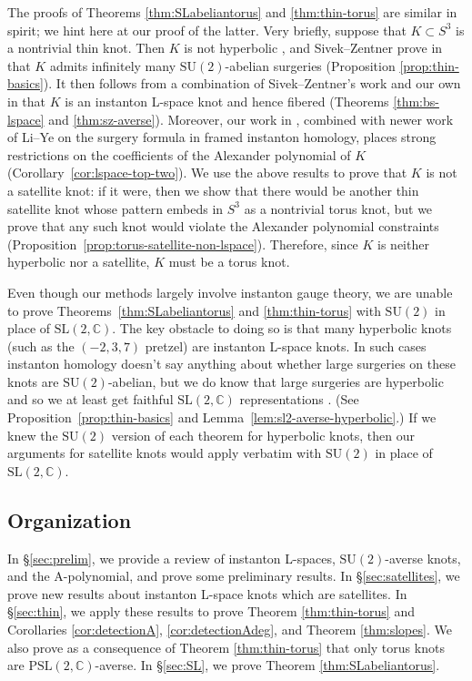 \documentclass[11pt]{amsart}
\numberwithin{equation}{section}
\numberwithin{theorem}{section}
\theoremstyle{definition}
\newcommand{\C}{\mathbb{C}}
\newcommand\SU{\mathrm{SU}}
\newcommand\SL{\mathrm{SL}}
\newcommand\PSL{\mathrm{PSL}}
\begin{document}
The proofs of Theorems \ref{thm:SLabeliantorus} and \ref{thm:thin-torus} are similar in spirit; we hint here at our proof of the latter. Very briefly, suppose that $K\subset S^3$ is a nontrivial thin knot. Then $K$ is not hyperbolic \cite{ccgls}, and Sivek--Zentner prove in \cite{sz-pillowcase} that $K$ admits infinitely many $\SU(2)$-abelian surgeries (Proposition \ref{prop:thin-basics}). It then follows from a combination of Sivek--Zentner's work and our own in \cite{bs-stein,bs-lspace} that $K$ is an instanton L-space knot and hence fibered (Theorems \ref{thm:bs-lspace} and \ref{thm:sz-averse}). Moreover, our work in \cite{bs-trefoil}, combined with newer work of Li--Ye \cite{li-ye-surgery} on the surgery formula in framed instanton homology, places strong restrictions on the coefficients of the Alexander polynomial of $K$ (Corollary~\ref{cor:lspace-top-two}). We use the above results to prove that $K$ is not a satellite knot: if it were, then we show that there would be another thin satellite knot whose pattern embeds in $S^3$ as a nontrivial torus knot, but we prove that any such knot would violate the Alexander polynomial constraints (Proposition~\ref{prop:torus-satellite-non-lspace}). Therefore, since $K$ is neither hyperbolic nor a satellite, $K$ must be a torus knot.

Even though our methods largely involve instanton gauge theory, we are unable to prove Theorems~\ref{thm:SLabeliantorus} and \ref{thm:thin-torus} with $\SU(2)$ in place of $\SL(2,\C)$.  The key obstacle to doing so is that many hyperbolic knots (such as the $(-2,3,7)$ pretzel) are instanton L-space knots.  In such cases instanton homology doesn't say anything about whether large surgeries on these knots are $\SU(2)$-abelian, but we do know that large surgeries are hyperbolic \cite{thurston-notes} and so we at least get faithful $\SL(2,\C)$ representations \cite{cs-splittings}.  (See Proposition~\ref{prop:thin-basics} and Lemma~\ref{lem:sl2-averse-hyperbolic}.)  If we knew the $\SU(2)$ version of each theorem for hyperbolic knots, then our arguments for satellite knots would apply verbatim with $\SU(2)$ in place of $\SL(2,\C)$.

\subsection{Organization}
In \S\ref{sec:prelim}, we provide a review of instanton L-spaces, $\SU(2)$-averse knots, and the A-polynomial, and prove some  preliminary results. In \S\ref{sec:satellites}, we prove  new results about instanton L-space knots which are  satellites. In \S\ref{sec:thin}, we apply these results  to prove Theorem \ref{thm:thin-torus} and Corollaries \ref{cor:detectionA}, \ref{cor:detectionAdeg}, and Theorem \ref{thm:slopes}. We also prove as a consequence of Theorem \ref{thm:thin-torus} that only torus knots are $\PSL(2,\C)$-averse. In \S\ref{sec:SL}, we prove Theorem \ref{thm:SLabeliantorus}.
\end{document}
